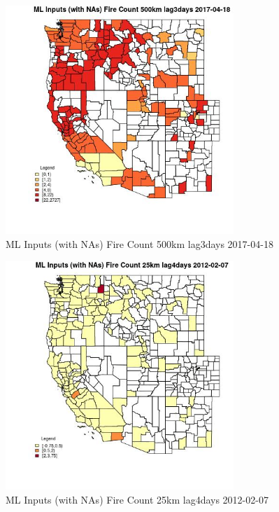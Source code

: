 \begin{figure} 
\centering  
\includegraphics[width=0.77\textwidth]{Code_Outputs/Report_ML_input_PM25_Step4_part_f_de_duplicated_aveswNAs_CountyFire_Count_500km_lag3daysMean2017-04-18.jpg} 
\caption{\label{fig:Report_ML_input_PM25_Step4_part_f_de_duplicated_aveswNAsCountyFire_Count_500km_lag3daysMean2017-04-18}ML Inputs (with NAs) Fire Count 500km lag3days 2017-04-18} 
\end{figure} 
 

\begin{figure} 
\centering  
\includegraphics[width=0.77\textwidth]{Code_Outputs/Report_ML_input_PM25_Step4_part_f_de_duplicated_aveswNAs_CountyFire_Count_25km_lag4daysMean2012-02-07.jpg} 
\caption{\label{fig:Report_ML_input_PM25_Step4_part_f_de_duplicated_aveswNAsCountyFire_Count_25km_lag4daysMean2012-02-07}ML Inputs (with NAs) Fire Count 25km lag4days 2012-02-07} 
\end{figure} 
 

